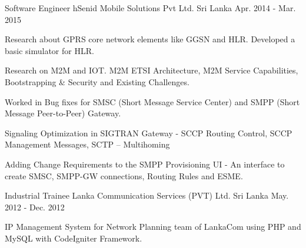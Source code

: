 \begin{cventries}
  \cventry
      {Software Engineer} %
      {hSenid Mobile Solutions Pvt Ltd.} %
      {Sri Lanka} %
      {Apr. 2014 - Mar. 2015} %
      { %
        \begin{cvitems}
          \item {Research about GPRS core network elements like GGSN and HLR. Developed a basic simulator for HLR.}
          \item {Research on M2M and IOT. M2M ETSI Architecture, M2M Service Capabilities, Bootstrapping \& Security and Existing Challenges.}
          \item {Worked in Bug fixes for SMSC (Short Message Service Center) and SMPP (Short Message Peer-to-Peer) Gateway.}
          \item {Signaling Optimization in SIGTRAN Gateway - SCCP Routing Control, SCCP Management Messages, SCTP – Multihoming}
          \item {Adding Change Requirements to the SMPP Provisioning UI - An interface to create SMSC, SMPP-GW connections, Routing Rules and ESME.}
        \end{cvitems}
      }


  \cventry
      {Industrial Trainee} %
      {Lanka Communication Services (PVT) Ltd.} %
      {Sri Lanka} %
      {May. 2012 - Dec. 2012} %
      { %
        \begin{cvitems}
          \item {IP Management System for Network Planning team of LankaCom using PHP and MySQL with CodeIgniter Framework.}
        \end{cvitems}
      }


\end{cventries}